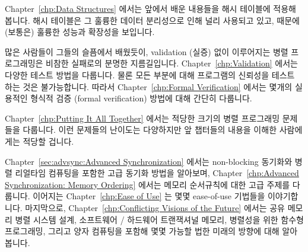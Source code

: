 Chapter~\ref{chp:Data Structures} 에서는 앞에서 배운 내용들을 해시 테이블에
적용해 봅니다.
해시 테이블은 그 훌륭한 데이터 분리성으로 인해 널리 사용되고 있고, 때문에
(보통은) 훌륭한 성능과 확장성을 보입니다.
\iffalse

Chapter~\ref{chp:Data Structures} applies the lessons of previous
chapters to hash tables, which are heavily used due
to their excellent partitionability, which (usually) leads to excellent
performance and scalability.
\fi

많은 사람들이 그들의 슬픔에서 배웠듯이, validation (실증) 없이 이루어지는 병렬
프로그래밍은 비참한 실패로의 분명한 지름길입니다.
Chapter~\ref{chp:Validation} 에서는 다양한 테스트 방법을 다룹니다.
물론 모든 부분에 대해 프로그램의 신뢰성을 테스트 하는 것은 불가능합니다.
따라서 Chapter~\ref{chp:Formal Verification} 에서는 몇개의 실용적인 형식적
검증 (formal verification) 방법에 대해 간단히 다룹니다.
\iffalse

As many have learned to their sorrow, parallel programming without
validation is a sure path to abject failure.
Chapter~\ref{chp:Validation} covers various forms of testing.
It is of course impossible to test reliability into your program
after the fact, so Chapter~\ref{chp:Formal Verification}
follows up with a brief overview of a couple of practical approaches to
formal verification.
\fi

Chapter~\ref{chp:Putting It All Together} 에서는 적당한 크기의 병렬 프로그래밍
문제들을 다룹니다.
이런 문제들의 난이도는 다양하지만 앞 챕터들의 내용을 이해한 사람에게는 적당할
겁니다.
\iffalse

Chapter~\ref{chp:Putting It All Together}
contains a series of moderate-sized parallel programming problems.
The difficulty of these problems vary, but should be appropriate for
someone who has mastered the material in the previous chapters.
\fi

Chapter~\ref{sec:advsync:Advanced Synchronization} 에서는 non-blocking 동기화와
병렬 리얼타임 컴퓨팅을 포함한 고급 동기화 방법을 알아보며,
Chapter~\ref{chp:Advanced Synchronization: Memory Ordering} 에서는 메모리
순서규칙에 대한 고급 주제를 다룹니다.
이어지는 Chapter~\ref{chp:Ease of Use} 는 몇몇 ease-of-use 기법들을
이야기합니다.
마지막으로, Chapter~\ref{chp:Conflicting Visions of the Future} 에서는 공유
메모리 병렬 시스템 설계, 소프트웨어 / 하드웨어 트랜잭셔널 메모리, 병렬성을 위한
함수형 프로그래밍, 그리고 양자 컴퓨팅을 포함해 몇몇 가능할 법한 미래의 방향에
대해 알아봅니다.
\iffalse

Chapter~\ref{sec:advsync:Advanced Synchronization}
looks at advanced synchronization methods, including
non-blocking synchronization and parallel real-time computing,
while Chapter~\ref{chp:Advanced Synchronization: Memory Ordering}
covers the advanced topic of memory ordering.
Chapter~\ref{chp:Ease of Use} follows up with some ease-of-use advice.
Finally, Chapter~\ref{chp:Conflicting Visions of the Future}
looks at a few possible future directions, including
shared-memory parallel system design, software and hardware transactional
memory, functional programming for parallelism, and quantum computing.
\fi

